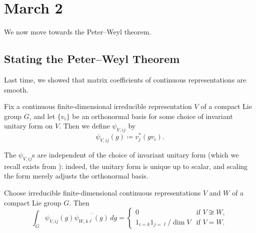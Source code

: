 \documentclass[../notes.tex]{subfiles}
\begin{document}
\section{March 2}
We now move towards the Peter--Weyl theorem.

\subsection{Stating the Peter--Weyl Theorem}
Last time, we showed that matrix coefficients of continuous representations are smooth.
\begin{notation}
	Fix a continuous finite-dimensional irreducible representation $V$ of a compact Lie group $G$, and let $\{v_i\}$ be an orthonormal basis for some choice of invariant unitary form on $V$. Then we define $\psi_{V,ij}$ by
	\[\psi_{V,ij}(g)\coloneqq v_j^*(gv_i).\]
\end{notation}
\begin{remark}
	The $\psi_{V,ij}$s are independent of the choice of invariant unitary form (which we recall exists from ): indeed, the unitary form is unique up to scalar, and scaling the form merely adjusts the orthonormal basis.
\end{remark}
\begin{proposition} \label{prop:matrix-coef-orthogonal}
	Choose irreducible finite-dimensional continuous representations $V$ and $W$ of a compact Lie group $G$. Then
	\[\int_G\psi_{V,ij}(g)\overline{\psi_{W,k\ell}(g)}\,dg=\begin{cases}
		0 & \text{if }V\not\cong W, \\
		1_{i=k}1_{j=\ell}/\dim V & \text{if }V=W.
	\end{cases}\]
\end{proposition}
\end{document}
